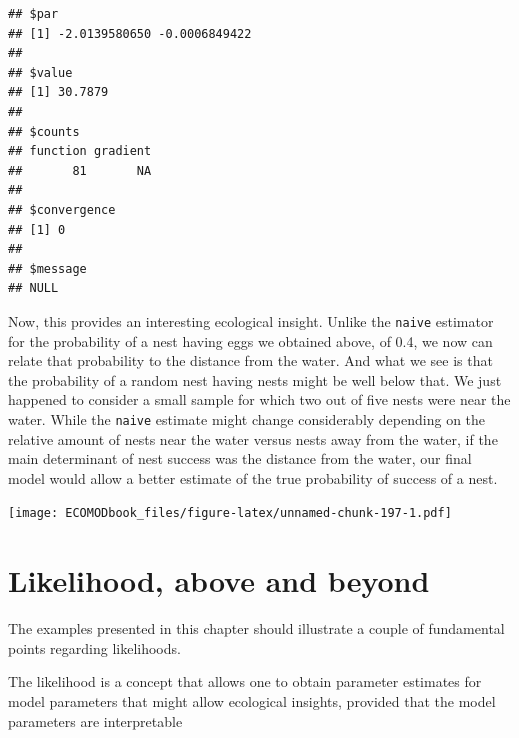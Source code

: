 \documentclass[
]{book}
\newenvironment{Shaded}{\begin{snugshade}}{\end{snugshade}}
\newcommand{\DataTypeTok}[1]{\textcolor[rgb]{0.13,0.29,0.53}{#1}}
\newcommand{\DecValTok}[1]{\textcolor[rgb]{0.00,0.00,0.81}{#1}}
\newcommand{\FloatTok}[1]{\textcolor[rgb]{0.00,0.00,0.81}{#1}}
\newcommand{\KeywordTok}[1]{\textcolor[rgb]{0.13,0.29,0.53}{\textbf{#1}}}
\newcommand{\NormalTok}[1]{#1}
\newcommand{\OperatorTok}[1]{\textcolor[rgb]{0.81,0.36,0.00}{\textbf{#1}}}
\newcommand{\StringTok}[1]{\textcolor[rgb]{0.31,0.60,0.02}{#1}}
\begin{document}
\begin{verbatim}
## $par
## [1] -2.0139580650 -0.0006849422
## 
## $value
## [1] 30.7879
## 
## $counts
## function gradient 
##       81       NA 
## 
## $convergence
## [1] 0
## 
## $message
## NULL
\end{verbatim}

Now, this provides an interesting ecological insight. Unlike the \texttt{naive} estimator for the probability of a nest having eggs we obtained above, of 0.4, we now can relate that probability to the distance from the water. And what we see is that the probability of a random nest having nests might be well below that. We just happened to consider a small sample for which two out of five nests were near the water. While the \texttt{naive} estimate might change considerably depending on the relative amount of nests near the water versus nests away from the water, if the main determinant of nest success was the distance from the water, our final model would allow a better estimate of the true probability of success of a nest.

\begin{Shaded}
\end{Shaded}

\texttt{[image: ECOMODbook\_files/figure-latex/unnamed-chunk-197-1.pdf]}

\hypertarget{likelihood-above-and-beyond}{%
\section{Likelihood, above and beyond}\label{likelihood-above-and-beyond}}

The examples presented in this chapter should illustrate a couple of fundamental points regarding likelihoods.

The likelihood is a concept that allows one to obtain parameter estimates for model parameters that might allow ecological insights, provided that the model parameters are interpretable
\end{document}
